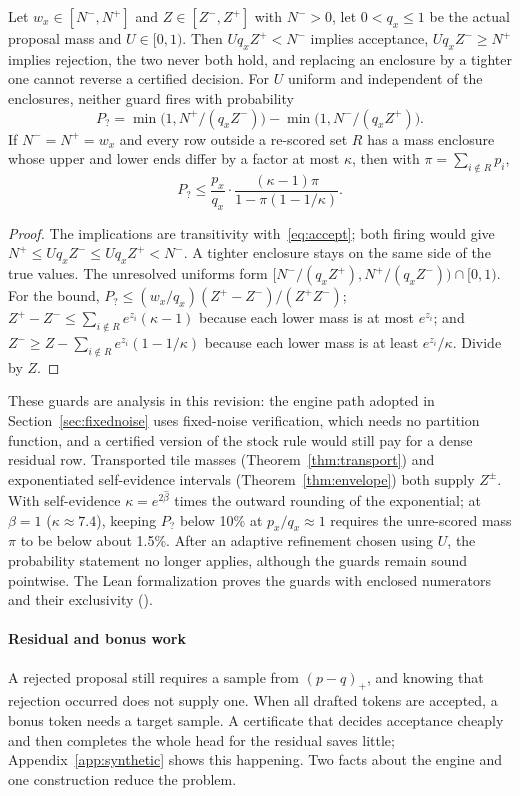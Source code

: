 \begin{theorem}\label{thm:guards}\label{thm:guard}
Let $w_x\in[N^-,N^+]$ and $Z\in[Z^-,Z^+]$ with $N^->0$, let $0<q_x\le1$ be the actual proposal mass and $U\in[0,1)$. Then $Uq_xZ^+<N^-$ implies acceptance, $Uq_xZ^-\ge N^+$ implies rejection, the two never both hold, and replacing an enclosure by a tighter one cannot reverse a certified decision. For $U$ uniform and independent of the enclosures, neither guard fires with probability
\[P_?=\min\bigl(1,N^+/(q_xZ^-)\bigr)-\min\bigl(1,N^-/(q_xZ^+)\bigr).\]
If $N^-=N^+=w_x$ and every row outside a re-scored set $R$ has a mass enclosure whose upper and lower ends differ by a factor at most $\kappa$, then with $\pi=\sum_{i\notin R}p_i$,
\[P_?\le\frac{p_x}{q_x}\cdot\frac{(\kappa-1)\pi}{1-\pi(1-1/\kappa)}.\]
\end{theorem}
\begin{proof}
The implications are transitivity with~\eqref{eq:accept}; both firing would give $N^+\le Uq_xZ^-\le Uq_xZ^+<N^-$. A tighter enclosure stays on the same side of the true values. The unresolved uniforms form $[N^-/(q_xZ^+),N^+/(q_xZ^-))\cap[0,1)$. For the bound, $P_?\le(w_x/q_x)(Z^+-Z^-)/(Z^+Z^-)$; $Z^+-Z^-\le\sum_{i\notin R}e^{z_i}(\kappa-1)$ because each lower mass is at most $e^{z_i}$; and $Z^-\ge Z-\sum_{i\notin R}e^{z_i}(1-1/\kappa)$ because each lower mass is at least $e^{z_i}/\kappa$. Divide by $Z$.
\end{proof}
These guards are analysis in this revision: the engine path adopted in Section~\ref{sec:fixednoise} uses fixed-noise verification, which needs no partition function, and a certified version of the stock rule would still pay for a dense residual row. Transported tile masses (Theorem~\ref{thm:transport}) and exponentiated self-evidence intervals (Theorem~\ref{thm:envelope}) both supply $Z^\pm$. With self-evidence $\kappa=e^{2\hat\beta}$ times the outward rounding of the exponential; at $\beta=1$ ($\kappa\approx7.4$), keeping $P_?$ below 10\% at $p_x/q_x\approx1$ requires the unre-scored mass $\pi$ to be below about 1.5\%. After an adaptive refinement chosen using $U$, the probability statement no longer applies, although the guards remain sound pointwise. The Lean formalization proves the guards with enclosed numerators and their exclusivity ().

\paragraph{Residual and bonus work}\label{sec:residual}
A rejected proposal still requires a sample from $(p-q)_+$, and knowing that rejection occurred does not supply one. When all drafted tokens are accepted, a bonus token needs a target sample. A certificate that decides acceptance cheaply and then completes the whole head for the residual saves little; Appendix~\ref{app:synthetic} shows this happening. Two facts about the engine and one construction reduce the problem.


